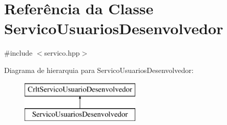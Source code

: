 \hypertarget{class_servico_usuarios_desenvolvedor}{}\section{Referência da Classe Servico\+Usuarios\+Desenvolvedor}
\label{class_servico_usuarios_desenvolvedor}


{\ttfamily \#include $<$servico.\+hpp$>$}

Diagrama de hierarquia para Servico\+Usuarios\+Desenvolvedor\+:\begin{figure}[H]
\begin{center}
\leavevmode
\includegraphics[height=2.000000cm]{class_servico_usuarios_desenvolvedor}
\end{center}
\end{figure}
